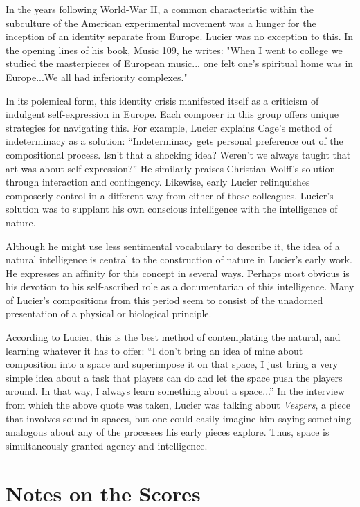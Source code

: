 \documentclass[a4paper,10pt]{report}
\numberwithin{equation}{section}
\begin{document}
In the years following World-War II, a common characteristic within the subculture of the American experimental movement was a hunger for the inception of an identity separate from Europe. Lucier was no exception to this. In the opening lines of his book, \underline{Music 109}, he writes: "When I went to college we studied the masterpieces of European music... one felt one's spiritual home was in Europe...We all had inferiority complexes." \cite[p.~1]{lucier2012}

In its polemical form, this identity crisis manifested itself as a criticism of indulgent self-expression in Europe. Each composer in this group offers unique strategies for navigating this. For example, Lucier explains Cage's method of indeterminacy as a solution: ``Indeterminacy gets personal preference out of the compositional process. Isn't that a shocking idea? Weren't we always taught that art was about self-expression?''\cite[p.~11]{lucier2012} He similarly praises Christian Wolff's solution through interaction and contingency.\cite[p.~46]{lucier2012} Likewise, early Lucier relinquishes composerly control in a different way from either of these colleagues. Lucier's solution was to supplant his own conscious intelligence with the intelligence of nature. 

Although he might use less sentimental vocabulary to describe it, the idea of a natural intelligence is central to the construction of nature in Lucier's early work. He expresses an affinity for this concept in several ways. Perhaps most obvious is his devotion to his self-ascribed role as a documentarian of this intelligence. Many of Lucier's compositions from this period seem to consist of the unadorned presentation of a physical or biological principle. 

According to Lucier, this is the best method of contemplating the natural, and learning whatever it has to offer: ``I don't bring an idea of mine about composition into a space and superimpose it on that space, I just bring a very simple idea about a task that players can do and let the space push the players around. In that way, I always learn something about a space...''\cite[p.~78]{lucier1995} In the interview from which the above quote was taken, Lucier was talking about \emph{Vespers}, a piece that involves sound in spaces, but one could easily imagine him saying something analogous about any of the processes his early pieces explore. Thus, space is simultaneously granted agency and intelligence.  

\section{Notes on the Scores}
\end{document}
